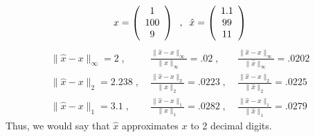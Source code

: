\[
x = \bmat{c} 1 \\ 100 \\ 9 \emat \; \; , \; \;
\hat{x} = \bmat{c} 1.1 \\ 99 \\ 11 \emat
\]
\begin{eqnarray*}
\| \hat{x} - x \|_{\infty} = 2 \; , \;  & \displaystyle{
\frac{\| \hat{x} - x \|_{\infty}}{\| x \|_{\infty}} = .02 }  \; , \; &
\frac{\| \hat{x} - x \|_{\infty}}{\| \hat{x} \|_{\infty}} = .0202  \\
\| \hat{x} - x \|_{2} = 2.238  \; , \;  & \displaystyle{
\frac{\| \hat{x} - x \|_{2}}{\| x \|_{2}} = .0223 }  \; , \; &
\frac{\| \hat{x} - x \|_{2}}{\| \hat{x} \|_{2}} = .0225  \\
\| \hat{x} - x \|_{1} = 3.1  \; , \; & \displaystyle{
\frac{\| \hat{x} - x \|_{1}}{\| x \|_{1}} = .0282 }  \; , \; &
\frac{\| \hat{x} - x \|_{1}}{\| \hat{x} \|_{1}} = .0279
\end{eqnarray*}
Thus, we would say that $\hat{x}$ approximates $x$ to 2
decimal digits.

